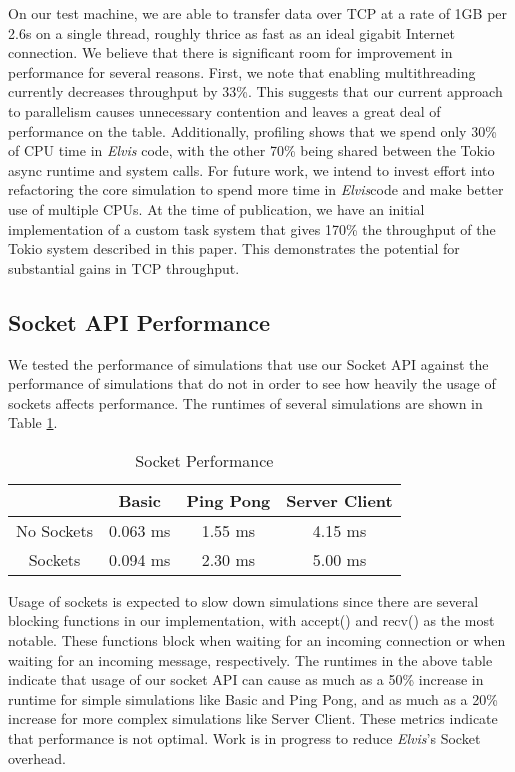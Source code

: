 \documentclass[journal]{IEEEtran} %
\newcommand{\elvis}{\textit{Elvis}}
\begin{document}
On our test machine, we are able to transfer data over TCP at a rate of 1GB per 2.6s on a single thread, roughly thrice as fast as an ideal gigabit Internet connection. We believe that there is significant room for improvement in performance for several reasons. First, we note that enabling multithreading currently decreases throughput by 33\%. This suggests that our current approach to parallelism causes unnecessary contention and  leaves a great deal of performance on the table. Additionally, profiling shows that we spend only 30\% of CPU time in \elvis{} code, with the other 70\% being shared between the Tokio async runtime and system calls. For future work, we intend to invest effort into refactoring the core simulation to spend more time in \elvis code and make better use of multiple CPUs. At the time of publication, we have an initial implementation of a custom task system that gives 170\% the throughput of the Tokio system described in this paper. This demonstrates the potential for substantial gains in TCP throughput.

\subsection{Socket API Performance}
We tested the performance of simulations that use our  Socket API against the performance of simulations that do not in order to see how heavily the usage of sockets affects performance. The runtimes of several simulations are shown in Table \ref{tab:socket_perf}.

\begin{table}[H]
    \caption{Socket Performance}
    \begin{center}
        \begin{tabular}{|c|c|c|c|}
            \hline
            \textbf{} & \textbf{Basic} & \textbf{Ping Pong} & \textbf{Server Client} \\
            \hline
            No Sockets & 0.063 ms & 1.55 ms & 4.15 ms \\
            \hline
            Sockets & 0.094 ms & 2.30 ms & 5.00 ms \\
            \hline
        \end{tabular}
        \label{tab:socket_perf}
    \end{center}
\end{table}

Usage of sockets is expected to slow down simulations since there are several blocking functions in our implementation, with accept() and recv() as the most notable. These functions block when waiting for an incoming connection or when waiting for an incoming message, respectively. The runtimes in the above table indicate that usage of our socket API can cause as much as a 50\% increase in runtime for simple simulations like Basic and Ping Pong, and as much as a 20\% increase for more complex simulations like Server Client. These metrics indicate that performance is not optimal. Work is in progress to reduce \elvis{}'s Socket overhead.
\end{document}
